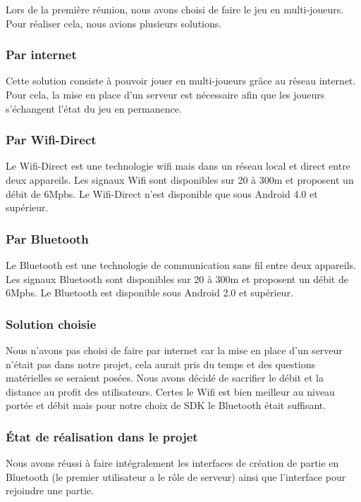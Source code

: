 \documentclass{report}
\begin{document}
Lors de la première réunion, nous avons choisi de faire le jeu en multi-joueurs. Pour réaliser cela, nous avions plusieurs solutions.

\subsubsection{Par internet}

Cette solution consiste à pouvoir jouer en multi-joueurs grâce au réseau internet. Pour cela, la mise en place d’un serveur est nécessaire afin que les joueurs s’échangent l’état du jeu en permanence.

\subsubsection{Par Wifi-Direct}

Le Wifi-Direct est une technologie wifi mais dans un réseau local et direct entre deux appareils. Les signaux Wifi sont disponibles sur 20 à 300m et proposent un débit de 6Mpbs.
Le Wifi-Direct n’est disponible que sous Android 4.0 et supérieur.

\subsubsection{Par Bluetooth}

Le Bluetooth est une technologie de communication sans fil entre deux appareils. Les signaux Bluetooth sont disponibles sur 20 à 300m et proposent un débit de 6Mpbs.
Le Bluetooth est disponible sous Android 2.0 et supérieur.

\subsubsection{Solution choisie}

Nous n’avons pas choisi de faire par internet car la mise en place d’un serveur n’était pas dans notre projet, cela aurait pris du temps et des questions matérielles se seraient posées. Nous avons décidé de sacrifier le débit et la distance au profit des utilisateurs. Certes le Wifi est bien meilleur au niveau portée et débit mais pour notre choix de SDK le Bluetooth était suffisant.

\subsubsection{État de réalisation dans le projet}

Nous avons réussi à faire intégralement les interfaces de création de partie en Bluetooth (le premier utilisateur a le rôle de serveur) ainsi que l’interface pour rejoindre une partie.
\end{document}

